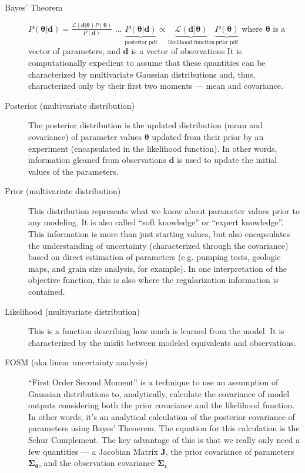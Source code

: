 \documentclass[english]{article}
\begin{document}
\begin{description}
\item [Bayes' Theorem] $P\left(\boldsymbol{\theta}|\boldsymbol{d}\right)=\frac{\mathcal{L}\left(\textbf{d}|\boldsymbol{\theta}\right) P\left(\boldsymbol{\theta}\right)}{P\left(\textbf{d}\right)}$ ... $\underbrace{P\left(\boldsymbol{\theta}|\textbf{d}\right)}_{\text{posterior pdf}} \propto \underbrace{\mathcal{L}\left(\boldsymbol{d}|\boldsymbol{\theta}\right) }_{\text{likelihood function}}\underbrace{P\left(\boldsymbol{\theta}\right)}_{\text{prior pdf}}$  \newline{} where $\boldsymbol{\theta}$ is a vector of parameters, and $\mathbf{d}$ is a vector of observations
It is computationally expedient to assume that these quantities can be characterized by multivariate Gaussian distributions and, thus, characterized only by their first two moments --- mean and covariance.
\item [Posterior (multivariate distribution)] The posterior distribution is the updated distribution (mean and covariance) of parameter values $\boldsymbol{\theta}$  updated from their prior by an experiment (encapsulated in the likelihood function). In other words, information gleaned from observations $\mathbf{d}$ is used to update the initial values of the parameters.
\item [Prior (multivariate distribution)] This distribution represents what we know about parameter values prior to any modeling. It is also called ``soft knowledge'' or ``expert knowledge''. This information is more than just starting values, but also encapsulates the understanding of uncertainty (characterized through the covariance) based on direct estimation of parameters (e.g. pumping tests, geologic maps, and grain size analysis, for example). In one interpretation of the objective function, this is also where the regularization information is contained.
\item [Likelihood (multivariate distribution)]  This is a function describing how much is learned from the model. It is characterized by the misfit between modeled equivalents and observations.
\item [FOSM (aka linear uncertainty analysis)] ``First Order Second Moment'' is a technique to use an assumption of Gaussian distributions to, analytically, calculate the covariance of model outputs considering both the prior covariance and the likelihood function. In other words, it's an analytical calculation of the posterior covariance of parameters using Bayes' Theoerem. The equation for this calculation is the Schur Complement. The key advantage of this is that we really only need a few quantities --- a Jacobian Matrix $\mathbf{J}$, the prior covariance of parameters $\boldsymbol{\Sigma_\theta}$, and the observation covariance $\boldsymbol{\Sigma_\epsilon}$

\end{description}
\end{document}
